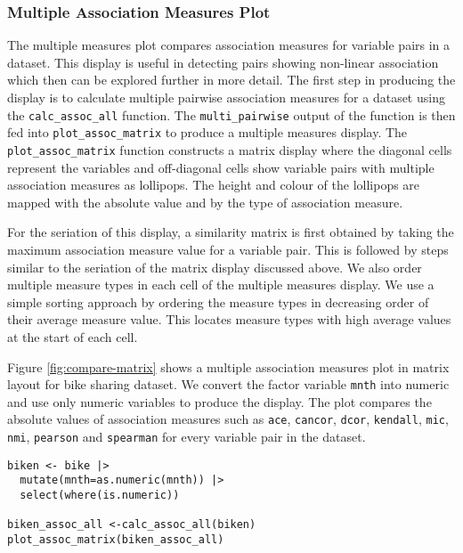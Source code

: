 \hypertarget{multiple-association-measures-plot}{%
\subsubsection{Multiple Association Measures Plot}\label{multiple-association-measures-plot}}

The multiple measures plot compares association measures for variable pairs in a dataset. This display is useful in detecting pairs showing non-linear association which then can be explored further in more detail. The first step in producing the display is to calculate multiple pairwise association measures for a dataset using the \texttt{calc\_assoc\_all} function. The \texttt{multi\_pairwise} output of the function is then fed into \texttt{plot\_assoc\_matrix} to produce a multiple measures display. The \texttt{plot\_assoc\_matrix} function constructs a matrix display where the diagonal cells represent the variables and off-diagonal cells show variable pairs with multiple association measures as lollipops. The height and colour of the lollipops are mapped with the absolute value and by the type of association measure.

For the seriation of this display, a similarity matrix is first obtained by taking the maximum association measure value for a variable pair. This is followed by steps similar to the seriation of the matrix display discussed above. We also order multiple measure types in each cell of the multiple measures display. We use a simple sorting approach by ordering the measure types in decreasing order of their average measure value. This locates measure types with high average values at the start of each cell.

Figure \ref{fig:compare-matrix} shows a multiple association measures plot in matrix layout for bike sharing dataset. We convert the factor variable \texttt{mnth} into numeric and use only numeric variables to produce the display. The plot compares the absolute values of association measures such as \texttt{ace}, \texttt{cancor}, \texttt{dcor}, \texttt{kendall}, \texttt{mic}, \texttt{nmi}, \texttt{pearson} and \texttt{spearman} for every variable pair in the dataset.

\begin{verbatim}
biken <- bike |>
  mutate(mnth=as.numeric(mnth)) |>
  select(where(is.numeric))

biken_assoc_all <-calc_assoc_all(biken)
plot_assoc_matrix(biken_assoc_all) 
\end{verbatim}


